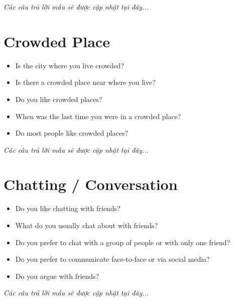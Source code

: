 \vspace{1em}
\textit{Các câu trả lời mẫu sẽ được cập nhật tại đây...}
\vspace{2em}

\section{Crowded Place}
\begin{ieltsprompt}
\begin{itemize}[itemsep=4pt]
    \item Is the city where you live crowded?
    \item Is there a crowded place near where you live?
    \item Do you like crowded places?
    \item When was the last time you were in a crowded place?
    \item Do most people like crowded places?
\end{itemize}
\end{ieltsprompt}

\vspace{1em}
\textit{Các câu trả lời mẫu sẽ được cập nhật tại đây...}
\vspace{2em}

\section{Chatting / Conversation}
\begin{ieltsprompt}
\begin{itemize}[itemsep=4pt]
    \item Do you like chatting with friends?
    \item What do you usually chat about with friends?
    \item Do you prefer to chat with a group of people or with only one friend?
    \item Do you prefer to communicate face-to-face or via social media?
    \item Do you argue with friends?
\end{itemize}
\end{ieltsprompt}

\vspace{1em}
\textit{Các câu trả lời mẫu sẽ được cập nhật tại đây...}
\vspace{2em}

